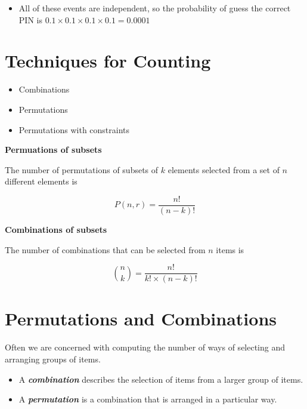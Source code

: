\documentclass[]{report}
\begin{document}
{\begin{itemize}
		\item All of these events are independent, so the probability of guess the correct PIN is $0.1 \times 0.1 \times 0.1 \times 0.1 = 0.0001$
	\end{itemize}



\section{Techniques for Counting}


\begin{itemize}
	\item Combinations
	\item Permutations
	\item Permutations with constraints
\end{itemize}




\noindent \textbf{Permuations of subsets}

The number of permutations of subsets of $k$ elements selected from a set of $n$ different elements is

\[P(n,r) = \frac{n!}{(n-k)!}  \]



\noindent \textbf{Combinations of subsets}

The number of combinations that can be selected from $n$ items is

\[ {n \choose k} = \frac{n!}{k! \times (n-k)!}  \]






	\section{Permutations and Combinations}
	
	
	Often we are concerned with computing the number of ways of selecting and arranging groups of items. \begin{itemize} \item  A \textbf{\emph{combination}} describes the selection of items from a larger group of items.  \item A \textbf{\emph{permutation}} is a combination that is arranged in a particular way.
	\end{itemize}

}
\end{document}
